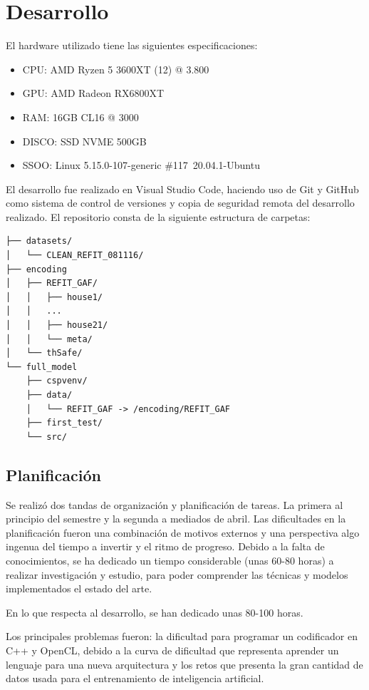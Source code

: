 \chapter{Desarrollo}
\label{ch:desarrollo}


El hardware utilizado tiene las siguientes especificaciones:
\begin{itemize}
    \item CPU: AMD Ryzen 5 3600XT (12) @ 3.800
    \item GPU: AMD Radeon RX6800XT 
    \item RAM: 16GB CL16 @ 3000
    \item DISCO: SSD NVME 500GB
    \item SSOO: Linux 5.15.0-107-generic \#117~20.04.1-Ubuntu
\end{itemize}

El desarrollo fue realizado en Visual Studio Code, haciendo uso de Git y GitHub como sistema de control de versiones y copia de seguridad remota del desarrollo realizado.
El repositorio consta de la siguiente estructura de carpetas:

\begin{verbatim}
├── datasets/
│   └── CLEAN_REFIT_081116/
├── encoding
│   ├── REFIT_GAF/
│   │   ├── house1/
│   │   ...
│   │   ├── house21/
│   │   └── meta/
│   └── thSafe/
└── full_model
    ├── cspvenv/
    ├── data/
    │   └── REFIT_GAF -> /encoding/REFIT_GAF
    ├── first_test/
    └── src/

\end{verbatim}

\section{Planificación}
\label{sec:planificacion}
Se realizó dos tandas de organización y planificación de tareas. La primera al principio del semestre y la segunda a mediados de abril. 
Las dificultades en la planificación fueron una combinación de motivos externos y una perspectiva algo ingenua del tiempo a invertir y el ritmo de progreso.
Debido a la falta de conocimientos, se ha dedicado un tiempo considerable (unas 60-80 horas) a realizar investigación y estudio, para poder comprender las técnicas y modelos implementados el estado del arte.

En lo que respecta al desarrollo, se han dedicado unas 80-100 horas.

Los principales problemas fueron: la dificultad para programar un codificador en C++ y OpenCL, debido a la curva de dificultad que representa aprender un lenguaje para una nueva arquitectura y los retos que presenta la gran cantidad de datos usada para el entrenamiento de inteligencia artificial. 


